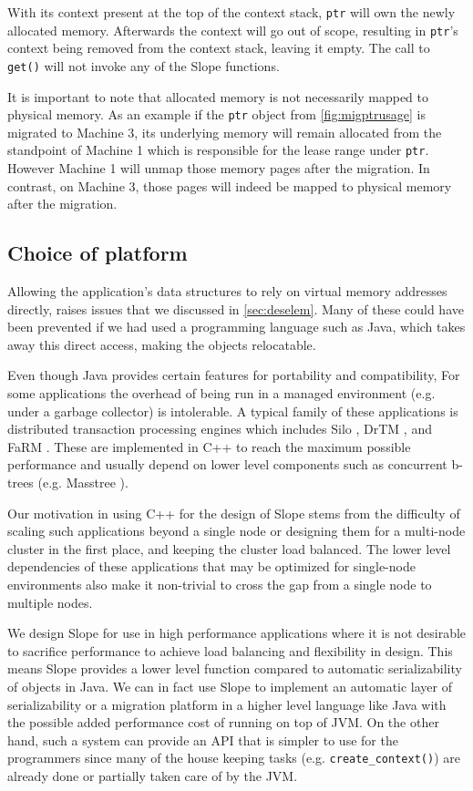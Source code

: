With its context present at the top of
the context stack,
\texttt{ptr} will own the newly allocated memory. Afterwards the context will
go out of scope, resulting in \texttt{ptr}'s context being removed from the
context stack, leaving it empty.
The call to \texttt{get()} will not invoke any of the Slope functions.

It is important to note that allocated memory is not necessarily mapped to
physical memory. As an example if the \texttt{ptr} object from
\autoref{fig:migptrusage} is migrated to Machine 3, its underlying memory
will remain allocated from the standpoint of Machine 1 which is responsible for
the lease range under \texttt{ptr}.
However Machine 1 will unmap those memory pages after the migration.
In contrast, on Machine 3, those pages will indeed be mapped to
physical memory after the migration.


\subsection{Choice of platform}
Allowing the application's data structures to rely on virtual memory
addresses directly, raises issues that we discussed in \ref{sec:deselem}. Many
of these could have been prevented if we had used a programming language such
as Java, which takes away this direct access, making the objects relocatable.

Even though Java provides certain features for portability and compatibility,
For some applications the overhead of being run in a managed environment
(e.g. under a garbage collector) is intolerable. A typical family of these
applications is distributed transaction
processing engines which includes Silo \cite{tu2013silo}, DrTM \cite{drtm2017},
and FaRM \cite{Dragojevic2014FaRM}. These are implemented in C++ to
reach the maximum possible performance and usually depend on lower level
components such as concurrent b-trees (e.g. Masstree \cite{mao2020masstree}).

Our motivation in using C++ for the design of Slope stems from the difficulty
of scaling such applications beyond a single node or designing them for a
multi-node cluster in the first place, and keeping the cluster load balanced.
The lower level dependencies of
these applications that may be optimized for single-node environments also
make it non-trivial to cross the gap from a single node to multiple nodes.

We design Slope for use in high performance applications where it is not
desirable to sacrifice performance to achieve load balancing and flexibility
in design. This means Slope provides a lower level function compared to
automatic serializability of objects in Java.
We can in fact use Slope to implement
an automatic layer of serializability or a migration platform in a higher
level language like Java with the possible added performance cost of running on
top of JVM. On the other hand, such a system can provide an API that is simpler
to use for the programmers since many of the house keeping tasks (e.g.
\texttt{create\_context()}) are already done or partially taken care of by the JVM.


